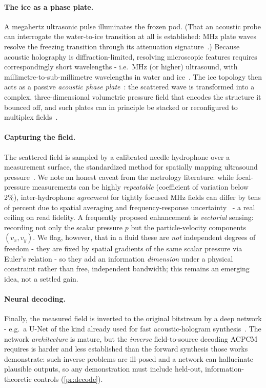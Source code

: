 \documentclass[11pt]{article}
\theoremstyle{definition}
\begin{document}
\paragraph{The ice as a phase plate.}
A megahertz ultrasonic pulse illuminates the frozen pod. (That an acoustic probe can
interrogate the water-to-ice transition at all is established: MHz plate waves resolve the
freezing transition through its attenuation signature~\cite{anisimkin2021platewave}.)
Because acoustic holography is
diffraction-limited, resolving microscopic features requires correspondingly short
wavelengths - i.e.\ MHz (or higher) ultrasound, with millimetre-to-sub-millimetre
wavelengths in water and ice~\cite{melde2016holograms,jimenez2019skull}. The ice topology
then acts as a passive \emph{acoustic phase plate}~\cite{melde2016holograms,brown2019phaseamp}:
the scattered wave is transformed into a complex, three-dimensional volumetric pressure
field that encodes the structure it bounced off, and such plates can in principle be
stacked or reconfigured to multiplex fields~\cite{brown2020stackable}.

\paragraph{Capturing the field.}
The scattered field is sampled by a calibrated needle hydrophone over a measurement
surface, the standardized method for spatially mapping ultrasound
pressure~\cite{iec62127}. We note an honest caveat from the metrology literature: while
focal-pressure measurements can be highly \emph{repeatable} (coefficient of variation
below 2\%), inter-hydrophone \emph{agreement} for tightly focused MHz fields can differ by
tens of percent due to spatial averaging and frequency-response
uncertainty~\cite{martin2019hydrophone} - a real ceiling on read fidelity. A frequently
proposed enhancement is \emph{vectorial} sensing: recording not only the scalar pressure
$p$ but the particle-velocity components $(v_x,v_y)$. We flag, however, that in a fluid
these are \emph{not} independent degrees of freedom - they are fixed by spatial gradients
of the same scalar pressure via Euler's relation - so they add an information
\emph{dimension} under a physical constraint rather than free, independent bandwidth; this
remains an emerging idea, not a settled gain.

\paragraph{Neural decoding.}
Finally, the measured field is inverted to the original bitstream by a deep network - e.g.\
a U-Net of the kind already used for fast acoustic-hologram
synthesis~\cite{lin2021dlholograms}. The network \emph{architecture} is mature, but the
\emph{inverse} field-to-source decoding ACPCM requires is harder and less established than
the forward synthesis those works demonstrate: such inverse problems are ill-posed and a
network can hallucinate plausible outputs, so any demonstration must include held-out,
information-theoretic controls (\cref{pr:decode}).
\end{document}
